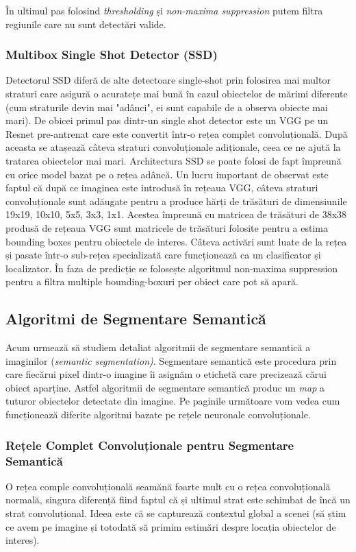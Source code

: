 În ultimul pas folosind \textit{thresholding} și \textit{non-maxima suppression} putem filtra regiunile care nu sunt detectări valide.

\subsubsection{Multibox Single Shot Detector (SSD)}	
Detectorul SSD diferă de alte detectoare single-shot prin folosirea mai multor straturi care asigură o acuratețe mai bună în cazul obiectelor de mărimi diferente (cum straturile devin mai "adânci", ei sunt capabile de a observa obiecte mai mari).\newline
De obicei primul pas dintr-un single shot detector este un VGG pe un Resnet pre-antrenat care este convertit într-o rețea complet convoluțională. După aceasta se atașează câteva straturi convoluționale adiționale, ceea ce ne ajută la tratarea obiectelor mai mari. Architectura SSD se poate folosi de fapt împreună cu orice model bazat pe o rețea adâncă.\newline
Un lucru important de observat este faptul că după ce imaginea este introdusă în rețeaua VGG, câteva straturi convoluționale sunt adăugate pentru a produce hărți de trăsături de dimensiunile 19x19, 10x10, 5x5, 3x3, 1x1. Acestea împreună cu matricea de trăsături de 38x38 produsă de rețeaua VGG sunt matricele de trăsături folosite pentru a estima bounding boxes pentru obiectele de interes.\newline
Câteva activări sunt luate de la rețea și pasate într-o sub-rețea specializată care funcționează ca un clasificator și localizator. În faza de predicție se folosește algoritmul non-maxima suppression pentru a filtra multiple bounding-boxuri per obiect care pot să apară.


\subsection{Algoritmi de Segmentare Semantică}
Acum urmează să studiem detaliat algoritmii de segmentare semantică a imaginilor (\textit{semantic segmentation)}. Segmentare semantică este procedura prin care fiecărui pixel dintr-o imagine îi asignăm o etichetă care precizează cărui obiect aparține. Astfel algoritmii de segmentare semantică produc un \textit{map} a tuturor obiectelor detectate din imagine. Pe paginile următoare vom vedea cum funcționează diferite algoritmi bazate pe rețele neuronale convoluționale.

\subsubsection{Rețele Complet Convoluționale pentru Segmentare Semantică}
O rețea comple convoluțională seamănă foarte mult cu o rețea convoluțională normală, singura diferență fiind faptul că și ultimul strat este schimbat de încă un strat convoluțional. Ideea este că se capturează contextul global a scenei (să știm ce avem pe imagine și totodată să primim estimări despre locația obiectelor de interes).

